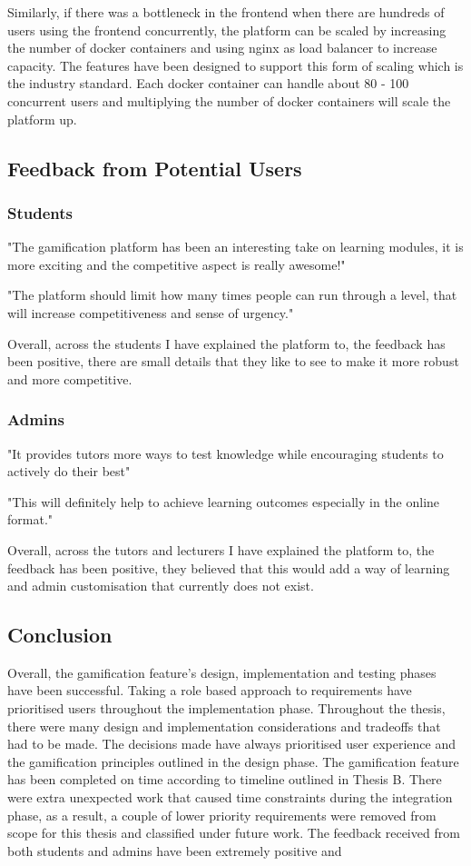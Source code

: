 Similarly, if there was a bottleneck in the frontend when there are hundreds of users using the frontend concurrently, the platform can be scaled by increasing the number of docker containers and using nginx as load balancer to increase capacity. The features have been designed to support this form of scaling which is the industry standard. Each docker container can handle about 80 - 100 concurrent users and multiplying the number of docker containers will scale the platform up.

\subsection{Feedback from Potential Users}
\subsubsection{Students}

"The gamification platform has been an interesting take on learning modules, it is more exciting and the competitive aspect is really awesome!"

"The platform should limit how many times people can run through a level, that will increase competitiveness and sense of urgency."

Overall, across the students I have explained the platform to, the feedback has been positive, there are small details that they like to see to make it more robust and more competitive.

\subsubsection{Admins}

"It provides tutors more ways to test knowledge while encouraging students to actively do their best"

"This will definitely help to achieve learning outcomes especially in the online format."

Overall, across the tutors and lecturers I have explained the platform to, the feedback has been positive, they believed that this would add a way of learning and admin customisation that currently does not exist.

\subsection{Conclusion}
Overall, the gamification feature's design, implementation and testing phases have been successful. Taking a role based approach to requirements have prioritised users throughout the implementation phase. Throughout the thesis, there were many design and implementation considerations and tradeoffs that had to be made. The decisions made have always prioritised user experience and the gamification principles outlined in the design phase. The gamification feature has been completed on time according to timeline outlined in Thesis B. There were extra unexpected work that caused time constraints during the integration phase, as a result, a couple of lower priority requirements were removed from scope for this thesis and classified under future work. The feedback received from both students and admins have been extremely positive and 


\newpage